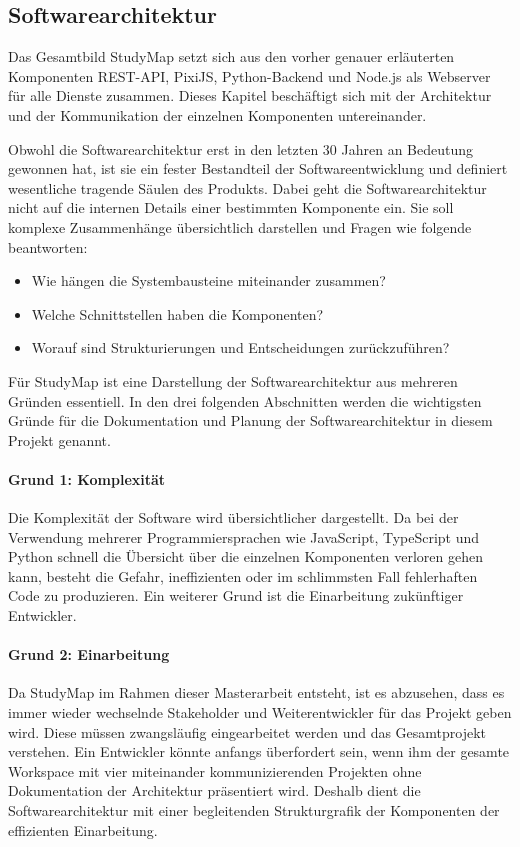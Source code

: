 \newpage
\subsection{Softwarearchitektur}
Das Gesamtbild StudyMap setzt sich aus den vorher genauer erläuterten Komponenten REST-API, PixiJS, Python-Backend und Node.js als Webserver für alle Dienste zusammen. Dieses Kapitel beschäftigt sich mit der Architektur und der Kommunikation der einzelnen Komponenten untereinander.

Obwohl die Softwarearchitektur erst in den letzten 30 Jahren an Bedeutung gewonnen hat, ist sie ein fester Bestandteil der Softwareentwicklung und definiert wesentliche tragende Säulen des Produkts. Dabei geht die Softwarearchitektur nicht auf die internen Details einer bestimmten Komponente ein. \parencite{vogel_einleitung_2009} Sie soll komplexe Zusammenhänge übersichtlich darstellen und Fragen wie folgende beantworten:
\begin{itemize}
    \item Wie hängen die Systembausteine miteinander zusammen?
    \item Welche Schnittstellen haben die Komponenten?
    \item Worauf sind Strukturierungen und Entscheidungen zurückzuführen?
\end{itemize}

Für StudyMap ist eine Darstellung der Softwarearchitektur aus mehreren Gründen essentiell. In den drei folgenden Abschnitten werden die wichtigsten Gründe für die Dokumentation und Planung der Softwarearchitektur in diesem Projekt genannt.

\paragraph*{Grund 1: Komplexität}
Die Komplexität der Software wird übersichtlicher dargestellt. Da bei der Verwendung mehrerer Programmiersprachen wie JavaScript, TypeScript und Python schnell die Übersicht über die einzelnen Komponenten verloren gehen kann, besteht die Gefahr, ineffizienten oder im schlimmsten Fall fehlerhaften Code zu produzieren. Ein weiterer Grund ist die Einarbeitung zukünftiger Entwickler.

\paragraph*{Grund 2: Einarbeitung}
Da StudyMap im Rahmen dieser Masterarbeit entsteht, ist es abzusehen, dass es immer wieder wechselnde Stakeholder und Weiterentwickler für das Projekt geben wird. Diese müssen zwangsläufig eingearbeitet werden und das Gesamtprojekt verstehen. Ein Entwickler könnte anfangs überfordert sein, wenn ihm der gesamte Workspace mit vier miteinander kommunizierenden Projekten ohne Dokumentation der Architektur präsentiert wird. Deshalb dient die Softwarearchitektur mit einer begleitenden Strukturgrafik der Komponenten der effizienten Einarbeitung.

